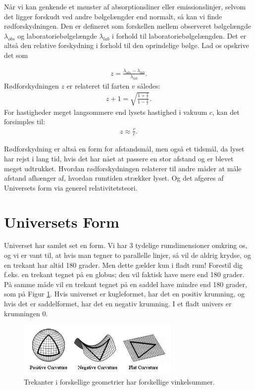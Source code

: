 Når vi kan genkende et mønster af absorptionsliner eller emissionslinjer, selvom det ligger forskudt ved andre bølgelængder end normalt, så kan vi finde rødforskydningen. Den er defineret som forskellen mellem observeret bølgelængde $\lambda_{obs}$ og laboratoriebølgelængde $\lambda_{lab}$ i forhold til laboratoriebølgelængden. Det er altså den relative forskydning i forhold til den oprindelige bølge. Lad os opskrive det som

\begin{align}
z=\frac{\lambda_{obs}-\lambda_{lab}}{\lambda_{lab}}.
\end{align}
Rødforskydningen $z$ er relateret til farten $v$ således:
\begin{align}
z+1=\sqrt{\frac{1+\frac{v}{c}}{1-\frac{v}{c}}}.
\end{align}
For hastigheder meget langsommere end lysets hastighed i vakuum $c$, kan det forsimples til:
\begin{align}
z\approx\frac{v}{c}.
\end{align}

Rødforskydning er altså en form for afstandsmål, men også et tidsmål, da lyset har rejst i lang tid, hvis det har nået at passere en stor afstand og er blevet meget udtrukket. Hvordan rødforskydningen relaterer til andre måder at måle afstand afhænger af, hvordan rumtiden strækker lyset. Og det afgøres af Universets form via generel relativitetsteori.

\section{Universets Form}

Universet har samlet set en form. Vi har 3 tydelige rumdimensioner omkring os, og vi er vant til, at hvis man tegner to parallelle linjer, så vil de aldrig krydse, og en trekant har altid 180 grader. Men dette gælder kun i fladt rum! Forestil dig f.eks. en trekant tegnet på en globus; den vil faktisk have mere end 180 grader. På samme måde vil en trekant tegnet på en saddel have mindre end 180 grader, som på Figur \ref{shapes}. Hvis universet er kugleformet, har det en positiv krumning, og hvis det er saddelformet, har det en negativ krumning. I et fladt univers er krumningen 0.

\begin{figure}[h!]
	\centering
	\includegraphics[width=0.7\textwidth]{Astrofysik/Astrofig/universe_geometry.png}
	\caption{Trekanter i forskellige geometrier har forskellige vinkelsummer. }
	\label{shapes}
\end{figure}

